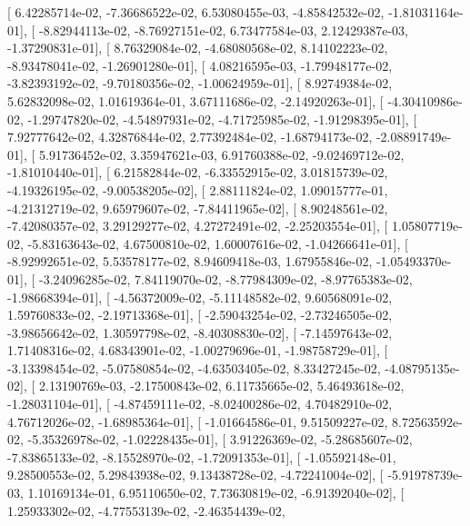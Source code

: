 \documentclass{article}
\begin{document}
       [  6.42285714e-02,  -7.36686522e-02,   6.53080455e-03,
         -4.85842532e-02,  -1.81031164e-01],
       [ -8.82944113e-02,  -8.76927151e-02,   6.73477584e-03,
          2.12429387e-03,  -1.37290831e-01],
       [  8.76329084e-02,  -4.68080568e-02,   8.14102223e-02,
         -8.93478041e-02,  -1.26901280e-01],
       [  4.08216595e-03,  -1.79948177e-02,  -3.82393192e-02,
         -9.70180356e-02,  -1.00624959e-01],
       [  8.92749384e-02,   5.62832098e-02,   1.01619364e-01,
          3.67111686e-02,  -2.14920263e-01],
       [ -4.30410986e-02,  -1.29747820e-02,  -4.54897931e-02,
         -4.71725985e-02,  -1.91298395e-01],
       [  7.92777642e-02,   4.32876844e-02,   2.77392484e-02,
         -1.68794173e-02,  -2.08891749e-01],
       [  5.91736452e-02,   3.35947621e-03,   6.91760388e-02,
         -9.02469712e-02,  -1.81010440e-01],
       [  6.21582844e-02,  -6.33552915e-02,   3.01815739e-02,
         -4.19326195e-02,  -9.00538205e-02],
       [  2.88111824e-02,   1.09015777e-01,  -4.21312719e-02,
          9.65979607e-02,  -7.84411965e-02],
       [  8.90248561e-02,  -7.42080357e-02,   3.29129277e-02,
          4.27272491e-02,  -2.25203554e-01],
       [  1.05807719e-02,  -5.83163643e-02,   4.67500810e-02,
          1.60007616e-02,  -1.04266641e-01],
       [ -8.92992651e-02,   5.53578177e-02,   8.94609418e-03,
          1.67955846e-02,  -1.05493370e-01],
       [ -3.24096285e-02,   7.84119070e-02,  -8.77984309e-02,
         -8.97765383e-02,  -1.98668394e-01],
       [ -4.56372009e-02,  -5.11148582e-02,   9.60568091e-02,
          1.59760833e-02,  -2.19713368e-01],
       [ -2.59043254e-02,  -2.73246505e-02,  -3.98656642e-02,
          1.30597798e-02,  -8.40308830e-02],
       [ -7.14597643e-02,   1.71408316e-02,   4.68343901e-02,
         -1.00279696e-01,  -1.98758729e-01],
       [ -3.13398454e-02,  -5.07580854e-02,  -4.63503405e-02,
          8.33427245e-02,  -4.08795135e-02],
       [  2.13190769e-03,  -2.17500843e-02,   6.11735665e-02,
          5.46493618e-02,  -1.28031104e-01],
       [ -4.87459111e-02,  -8.02400286e-02,   4.70482910e-02,
          4.76712026e-02,  -1.68985364e-01],
       [ -1.01664586e-01,   9.51509227e-02,   8.72563592e-02,
         -5.35326978e-02,  -1.02228435e-01],
       [  3.91226369e-02,  -5.28685607e-02,  -7.83865133e-02,
         -8.15528970e-02,  -1.72091353e-01],
       [ -1.05592148e-01,   9.28500553e-02,   5.29843938e-02,
          9.13438728e-02,  -4.72241004e-02],
       [ -5.91978739e-03,   1.10169134e-01,   6.95110650e-02,
          7.73630819e-02,  -6.91392040e-02],
       [  1.25933302e-02,  -4.77553139e-02,  -2.46354439e-02,
\end{document}
